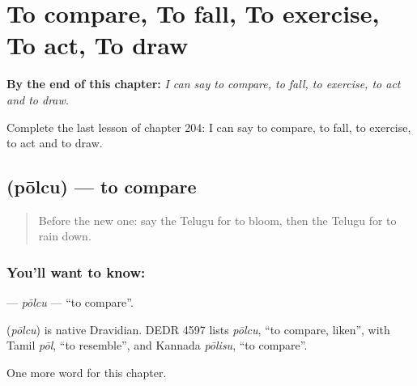 
\chapter{To compare, To fall, To exercise, To act, To draw}
\label{ch:te-to-compare-to-fall-to-exercise-to-act-to-draw}

\begin{chapteropening}
\textbf{By the end of this chapter:} \emph{I can say to compare, to fall, to exercise, to act and to draw.}

Complete the last lesson of chapter 204: I can say to compare, to fall, to exercise, to act and to draw.
\end{chapteropening}

\section[\texorpdfstring{\te{పోల్చు} (pōlcu)}{పోల్చు (pōlcu)}]{ (pōlcu) — to compare}

\label{lesson:TE-C204-polcu}



\begin{quote}
Before the new one: say the Telugu for to bloom, then the Telugu for to rain down.
\end{quote}

\subsection*{You'll want to know: }
\textbf{} — \emph{pōlcu} — \textquotedblleft{}to compare\textquotedblright{}.

\begin{cousinweb}
\textbf{} (\emph{pōlcu}) is native Dravidian. DEDR 4597 lists \emph{pōlcu}, \textquotedblleft{}to compare, liken\textquotedblright{}, with Tamil \emph{pōl}, \textquotedblleft{}to resemble\textquotedblright{}, and Kannada \emph{pōlisu}, \textquotedblleft{}to compare\textquotedblright{}.
\end{cousinweb}

\begin{grammarlens}[title={What you've built}]
One more word for this chapter.
\end{grammarlens}

